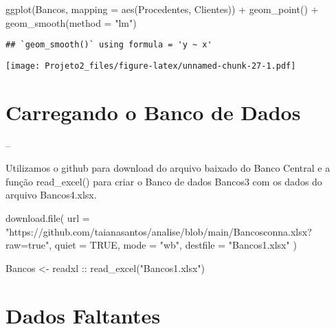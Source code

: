 \documentclass[
]{article}
\newenvironment{Shaded}{\begin{snugshade}}{\end{snugshade}}
\newcommand{\AttributeTok}[1]{\textcolor[rgb]{0.77,0.63,0.00}{#1}}
\newcommand{\ConstantTok}[1]{\textcolor[rgb]{0.00,0.00,0.00}{#1}}
\newcommand{\FunctionTok}[1]{\textcolor[rgb]{0.00,0.00,0.00}{#1}}
\newcommand{\NormalTok}[1]{#1}
\newcommand{\OtherTok}[1]{\textcolor[rgb]{0.56,0.35,0.01}{#1}}
\newcommand{\SpecialCharTok}[1]{\textcolor[rgb]{0.00,0.00,0.00}{#1}}
\newcommand{\StringTok}[1]{\textcolor[rgb]{0.31,0.60,0.02}{#1}}
\begin{document}
\begin{Shaded}
\begin{Highlighting}[]
\FunctionTok{ggplot}\NormalTok{(Bancos, }\AttributeTok{mapping =} \FunctionTok{aes}\NormalTok{(Procedentes, Clientes)) }\SpecialCharTok{+}
   \FunctionTok{geom\_point}\NormalTok{() }\SpecialCharTok{+}
   \FunctionTok{geom\_smooth}\NormalTok{(}\AttributeTok{method =} \StringTok{"lm"}\NormalTok{)}
\end{Highlighting}
\end{Shaded}

\begin{verbatim}
## `geom_smooth()` using formula = 'y ~ x'
\end{verbatim}

\texttt{[image: Projeto2\_files/figure-latex/unnamed-chunk-27-1.pdf]}

\hypertarget{section}{%
\subsection{}\label{section}}

\hypertarget{carregando-o-banco-de-dados-1}{%
\section{Carregando o Banco de
Dados}\label{carregando-o-banco-de-dados-1}}

--

Utilizamos o github para download do arquivo baixado do Banco Central e
a função read\_excel() para criar o Banco de dados Bancos3 com os dados
do arquivo Bancos4.xlsx.

\begin{Shaded}
\begin{Highlighting}[]
\FunctionTok{download.file}\NormalTok{( }\AttributeTok{url =} \StringTok{"https://github.com/taianasantos/analise/blob/main/Bancosconna.xlsx?raw=true"}\NormalTok{, }\AttributeTok{quiet =} \ConstantTok{TRUE}\NormalTok{,  }\AttributeTok{mode =} \StringTok{"wb"}\NormalTok{, }\AttributeTok{destfile =} \StringTok{"Bancos1.xlsx"}\NormalTok{ )}

\NormalTok{Bancos }\OtherTok{\textless{}{-}}\NormalTok{ readxl }\SpecialCharTok{::} \FunctionTok{read\_excel}\NormalTok{(}\StringTok{"Bancos1.xlsx"}\NormalTok{)}
\end{Highlighting}
\end{Shaded}

\hypertarget{dados-faltantes}{%
\section{Dados Faltantes}\label{dados-faltantes}}
\end{document}
